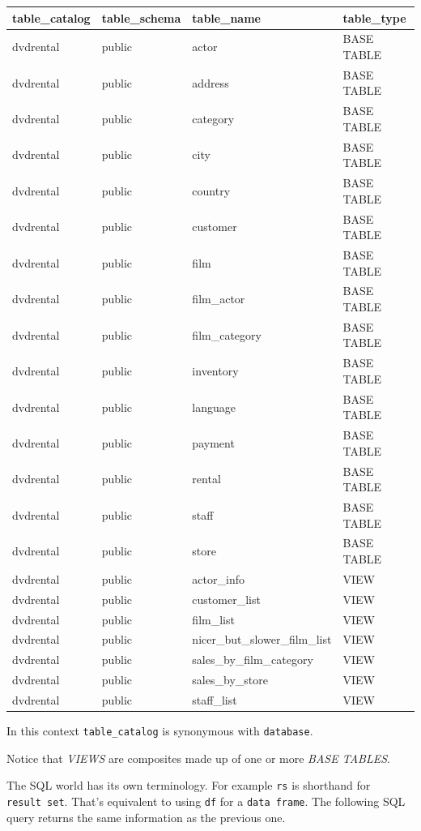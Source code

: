 \documentclass[]{book}
\theoremstyle{definition}
\theoremstyle{definition}
\theoremstyle{definition}
\theoremstyle{remark}
\begin{document}
\begin{tabular}{l|l|l|l}
\hline
table\_catalog & table\_schema & table\_name & table\_type\\
\hline
dvdrental & public & actor & BASE TABLE\\
\hline
dvdrental & public & address & BASE TABLE\\
\hline
dvdrental & public & category & BASE TABLE\\
\hline
dvdrental & public & city & BASE TABLE\\
\hline
dvdrental & public & country & BASE TABLE\\
\hline
dvdrental & public & customer & BASE TABLE\\
\hline
dvdrental & public & film & BASE TABLE\\
\hline
dvdrental & public & film\_actor & BASE TABLE\\
\hline
dvdrental & public & film\_category & BASE TABLE\\
\hline
dvdrental & public & inventory & BASE TABLE\\
\hline
dvdrental & public & language & BASE TABLE\\
\hline
dvdrental & public & payment & BASE TABLE\\
\hline
dvdrental & public & rental & BASE TABLE\\
\hline
dvdrental & public & staff & BASE TABLE\\
\hline
dvdrental & public & store & BASE TABLE\\
\hline
dvdrental & public & actor\_info & VIEW\\
\hline
dvdrental & public & customer\_list & VIEW\\
\hline
dvdrental & public & film\_list & VIEW\\
\hline
dvdrental & public & nicer\_but\_slower\_film\_list & VIEW\\
\hline
dvdrental & public & sales\_by\_film\_category & VIEW\\
\hline
dvdrental & public & sales\_by\_store & VIEW\\
\hline
dvdrental & public & staff\_list & VIEW\\
\hline
\end{tabular}

In this context \texttt{table\_catalog} is synonymous with
\texttt{database}.

Notice that \emph{VIEWS} are composites made up of one or more
\emph{BASE TABLES}.

The SQL world has its own terminology. For example \texttt{rs} is
shorthand for \texttt{result\ set}. That's equivalent to using
\texttt{df} for a \texttt{data\ frame}. The following SQL query returns
the same information as the previous one.
\end{document}
